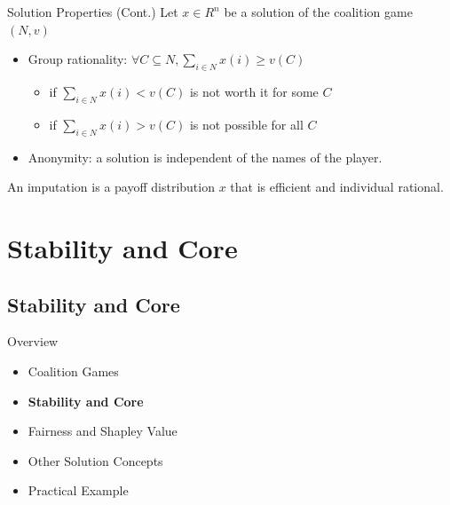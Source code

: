 \documentclass{beamer}
\begin{document}
\begin{frame}{Solution Properties (Cont.)}
    Let $x \in R^n$ be a solution of the coalition game $(N,v)$
    \begin{itemize}
        \item {\color{blue} Group rationality:} $\forall C \subseteq N, \sum_{i \in N} x(i) \geq v(C)$
        \begin{itemize}
            \item if $\sum_{i \in N} x(i) < v(C)$ is not worth it for some $C$
            \item if $\sum_{i \in N} x(i) > v(C)$ is not possible for all $C$
        \end{itemize}
        \item {\color{blue} Anonymity:} a solution is independent of the names of the player.
    \end{itemize}

    \vspace{0.2cm}

    An {\color{blue} imputation} is a payoff distribution $x$ that is efficient and individual rational.

\end{frame}
\section{Stability and Core}
\subsection{Stability and Core}

\begin{frame}{Overview}
    \begin{itemize}
     	\itemsep=.5cm
    	\item Coalition Games
    	\item {\bf Stability and Core}
    	\item Fairness and Shapley Value
    	\item Other Solution Concepts
        \item Practical Example
    \end{itemize}
\end{frame}
\end{document}
